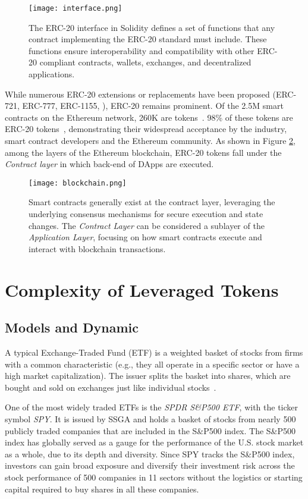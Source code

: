 \begin{figure}[t]
	\centering
	\texttt{[image: interface.png]}
	\caption{The ERC-20 interface in Solidity defines a set of functions that any contract implementing the ERC-20 standard must include. These functions ensure interoperability and compatibility with other ERC-20 compliant contracts, wallets, exchanges, and decentralized applications.}
	\label{fig:interface}
\end{figure}

While numerous ERC-20 extensions or replacements have been proposed (\eg ERC-721, ERC-777, ERC-1155, \etc), ERC-20 remains prominent. Of the 2.5M smart contracts on the Ethereum network, 260K are tokens~\cite{TokenTracker}. 98\% of these tokens are ERC-20 tokens~\cite{TokenTracker}, demonstrating their widespread acceptance by the industry, smart contract developers and the Ethereum community. As shown in Figure \ref{fig:layers}, among the layers of the Ethereum blockchain, ERC-20 tokens fall under the \textit{Contract layer} in which back-end of DApps are executed.

\begin{figure}[t]
	\centering
	\texttt{[image: blockchain.png]}
	\caption{Smart contracts generally exist at the contract layer, leveraging the underlying consensus mechanisms for secure execution and state changes. The \textit{Contract Layer} can be considered a sublayer of the \textit{Application Layer}, focusing on how smart contracts execute and interact with blockchain transactions.}
	\label{fig:layers}
\end{figure}

\section{Complexity of Leveraged Tokens}
\subsection{Models and Dynamic}
A typical Exchange-Traded Fund (ETF) is a weighted basket of stocks from firms with a common characteristic (e.g., they all operate in a specific sector or have a high market capitalization). The issuer splits the basket into shares, which are bought and sold on exchanges just like individual stocks~\cite{liebi2020effect}.
\begin{example}
	One of the most widely traded ETFs is the \textsl{SPDR S\&P500 ETF}, with the ticker symbol \textsl{SPY}. It is issued by SSGA and holds a basket of stocks from nearly 500 publicly traded companies that are included in the S\&P500 index. The S\&P500 index has globally served as a gauge for the performance of the U.S. stock market as a whole, due to its depth and diversity. Since SPY tracks the S\&P500 index, investors can gain broad exposure and diversify their investment risk across the stock performance of 500 companies in 11 sectors without the logistics or starting capital required to buy shares in all these companies.
\end{example}

